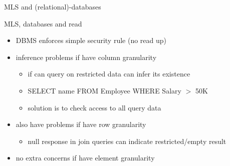 \documentclass{beamer}
\begin{document}
\begin{frame}{MLS and (relational)-databases}
\end{frame}

\begin{frame}{MLS, databases and read}
  \begin{itemize}
  \item DBMS enforces simple security rule (no read up) 
  \item inference problems if have column granularity
    \begin{itemize}
    \item if can query on restricted data can infer its existence 
    \item SELECT name FROM Employee WHERE Salary $>$ 50K 
    \item solution is to check access to all query data 
    \end{itemize}
  \item also have problems if have row granularity 
    \begin{itemize}
    \item null response in join queries can indicate restricted/empty result 
    \end{itemize}
  \item no extra concerns if have element granularity 
  \end{itemize}
\end{frame}
\end{document}
